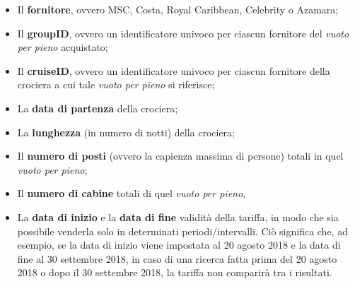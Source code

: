 \begin{itemize}
	\item Il \textbf{fornitore}, ovvero MSC, Costa, Royal Caribbean, Celebrity o Azamara;
	\item Il \textbf{groupID}, ovvero un identificatore univoco per ciascun fornitore del \textit{vuoto per pieno} acquistato;
	\item Il \textbf{cruiseID}, ovvero un identificatore univoco per ciascun fornitore della crociera a cui tale \textit{vuoto per pieno} si riferisce;
	\item La \textbf{data di partenza} della crociera;
	\item La \textbf{lunghezza} (in numero di notti) della crociera;
	\item Il \textbf{numero di posti} (ovvero la capienza massima di persone) totali in quel \textit{vuoto per pieno};
	\item Il \textbf{numero di cabine} totali di quel \textit{vuoto per pieno},
	\item La \textbf{data di inizio} e la \textbf{data di fine} validità della tariffa, in modo che sia possibile venderla solo in determinati periodi/intervalli. Ciò significa che, ad esempio, se la data di inizio viene impostata al 20 agosto 2018 e la data di fine al 30 settembre 2018, in caso di una ricerca fatta prima del 20 agosto 2018 o dopo il 30 settembre 2018, la tariffa non comparirà tra i risultati.
\end{itemize}
